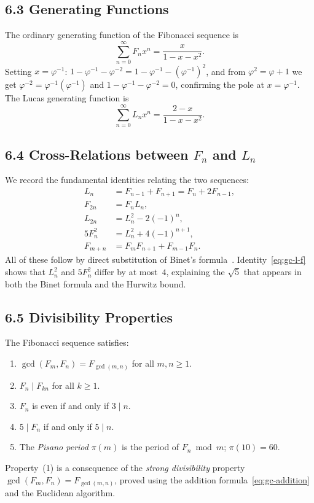 \subsection{6.3 Generating Functions}
\label{subsec:gc-gf}

The ordinary generating function of the Fibonacci
sequence is
\[
  \sum_{n=0}^{\infty} F_n x^n = \frac{x}{1-x-x^2}.
\]
Setting $x = \varphi^{-1}$:
$1 - \varphi^{-1} - \varphi^{-2}
 = 1 - \varphi^{-1} - (\varphi^{-1})^2$,
and from $\varphi^2 = \varphi+1$ we get
$\varphi^{-2} = \varphi^{-1}(\varphi^{-1})$
and $1 - \varphi^{-1} - \varphi^{-2} = 0$,
confirming the pole at $x=\varphi^{-1}$.
The Lucas generating function is
\[
  \sum_{n=0}^{\infty} L_n x^n = \frac{2-x}{1-x-x^2}.
\]

\subsection{6.4 Cross-Relations between $F_n$ and $L_n$}
\label{subsec:gc-cross}

We record the fundamental identities relating the two
sequences:
\begin{align}
  L_n &= F_{n-1} + F_{n+1} = F_n + 2F_{n-1},
  \label{eq:gc-lucas-fib}\\
  F_{2n} &= F_n L_n,
  \label{eq:gc-double}\\
  L_{2n} &= L_n^2 - 2(-1)^n,
  \label{eq:gc-lucas-double}\\
  5 F_n^2 &= L_n^2 + 4(-1)^{n+1},
  \label{eq:gc-l-f}\\
  F_{m+n} &= F_m F_{n+1} + F_{m-1} F_n.
  \label{eq:gc-addition}
\end{align}
All of these follow by direct substitution of
Binet's formula~\cite{koshy_fib_lucas}.
Identity~\eqref{eq:gc-l-f} shows that $L_n^2$ and
$5 F_n^2$ differ by at most~$4$, explaining the
$\sqrt{5}$ that appears in both the Binet formula
and the Hurwitz bound.

\subsection{6.5 Divisibility Properties}
\label{subsec:gc-divisibility}

The Fibonacci sequence satisfies:
\begin{enumerate}
  \item $\gcd(F_m, F_n) = F_{\gcd(m,n)}$ for all
        $m, n \geq 1$.
  \item $F_n \mid F_{kn}$ for all $k \geq 1$.
  \item $F_n$ is even if and only if $3 \mid n$.
  \item $5 \mid F_n$ if and only if $5 \mid n$.
  \item The \emph{Pisano period} $\pi(m)$ is the
        period of $F_n \bmod m$; $\pi(10) = 60$.
\end{enumerate}
Property~(1) is a consequence of the
\emph{strong divisibility} property
$\gcd(F_m,F_n) = F_{\gcd(m,n)}$,
proved using the addition formula~\eqref{eq:gc-addition}
and the Euclidean algorithm.

